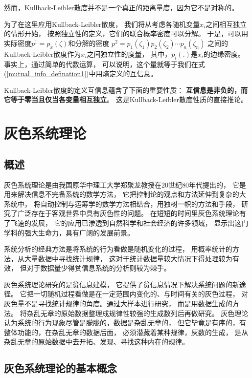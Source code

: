 然而，Kullback-Leibler散度并不是一个真正的距离量度，因为它不是对称的。

为了在这里应用Kullback-Leibler散度，
我们将从考虑各随机变量$x_i$之间相互独立的情形开始，
按照独立性的定义，它们的联合概率密度可以分解。
于是，可以用实际密度$p^1=p_x(\zeta)$和分解的密度
$p^2=p_1(\zeta_1)p_2(\zeta_2)\cdots p_n(\zeta_n)$
之间的Kullback-Leibler散度作为$x_i$之间独立性的度量，
其中，$p_i(.)$是$x_i$的边缘密度。事实上，通过简单的代数运算，
可以说明，这个量就等于我们在式(\ref{mutual_info_defination1})中用熵定义的互信息。

Kullback-Leibler散度的定义互信息蕴含了下面的重要性质：
\textbf{互信息是非负的，而它等于零当且仅当各变量相互独立}。
这是Kullback-Leibler散度性质的直接推论。
 

\section{灰色系统理论\cite{DEFORM03}}
\subsection{概述}
灰色系统理论是由我国原华中理工大学郑聚龙教授在20世纪80年代提出的，
它是用来解决信息不完备系统的数学方法，
它把控制论的观点和方法延伸到复杂的大系统中，
将自动控制与运筹学的数学方法相结合，用独树一帜的方法和手段，
研究了广泛存在于客观世界中具有灰色性的问题。
在短短的时间里灰色系统理论有了飞速的发展，
它的应用已渗透到自然科学和社会经济的许多领域，
显示出这门学科的强大生命力，具有广阔的发展前景。

系统分析的经典方法是将系统的行为看做是随机变化的过程，
用概率统计的方法，从大量数据中寻找统计规律，
这对于统计数据量较大情况下得处理较为有效，
但对于数据量少得贫信息系统的分析则较为棘手。

灰色系统理论研究的是贫信息建模，
它提供了贫信息情况下解决系统问题的新途径。
它把一切随机过程看做是在一定范围内变化的、与时间有关的灰色过程，
对灰色量不是寻找统计规律的角度。通过大样本进行研究，
而是用数据生成的方法。
将杂乱无章的原始数据整理成规律性较强的生成数列后再做研究。
灰色理论认为系统的行为现象尽管是朦胧的，数据是杂乱无章的，
但它毕竟是有序的，有整体功能的，在杂乱无章的数据后面，
必须潜藏着某种规律，灰数的生成，
是从杂乱无章的原始数据中去开拓、发现、寻找这种内在的规律。

\subsection{灰色系统理论的基本概念}
